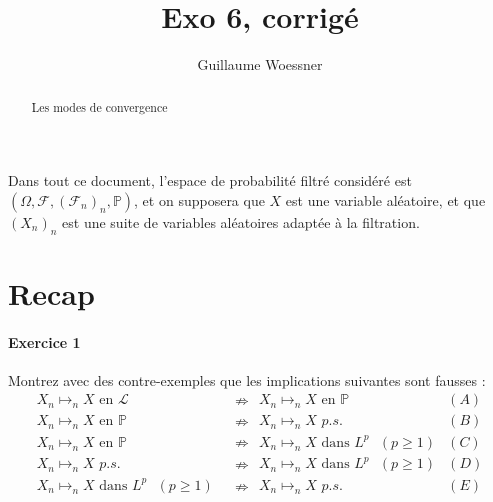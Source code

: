 \documentclass{article}
\title{Exo 6, corrigé}
\author{Guillaume Woessner}
\date{}                       %
\theoremstyle{definition}
\numberwithin{equation}{section}
\begin{document}
\maketitle                    %

\begin{abstract}
\begin{center}
Les modes de convergence
\end{center}
\end{abstract}



Dans tout ce document, l'espace de probabilité filtré considéré est $(\Omega,\mathcal{F},(\mathcal{F}_n)_n,\mathbb{P})$, et on supposera que $X$ est une variable aléatoire, et que $(X_n)_n$ est une suite de variables aléatoires adaptée à la filtration.


\section{Recap}

\paragraph{Exercice 1}
Montrez avec des contre-exemples que les implications suivantes sont fausses :
\begin{align*}
    X_n \mapsto_n X \text{ en } \mathcal{L} ~~ &\nRightarrow~~  X_n \mapsto_n X \text{ en } \mathbb{P} & (A)\\
    X_n \mapsto_n X \text{ en } \mathbb{P} ~~ &\nRightarrow~~  X_n \mapsto_n X \textit{ p.s.}& (B)\\
    X_n \mapsto_n X \text{ en } \mathbb{P} ~~ &\nRightarrow~~  X_n \mapsto_n X \text{ dans } L^p ~~~ (p\geq 1)& (C)\\
    X_n \mapsto_n X \textit{ p.s.} ~~ &\nRightarrow~~  X_n \mapsto_n X \text{ dans } L^p ~~~ (p\geq 1)& (D)\\
    X_n \mapsto_n X \text{ dans } L^p ~~~ (p\geq 1) ~~ &\nRightarrow~~  X_n \mapsto_n X \textit{ p.s.}& (E)
\end{align*}
\end{document}
